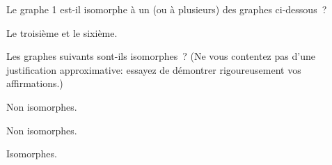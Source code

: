 \begin{exo}
Le graphe 1 est-il isomorphe \`a un (ou \`a plusieurs) des graphes ci-dessous~?
\end{exo}

\begin{figure}[!h]
\centering
\scalebox{.825}{}
\caption{}
\end{figure}

\begin{figure}[!h]
\scalebox{.825}{}
\caption{}
\end{figure}

Le troisième et le sixième.

\newpage


\begin{exo}
Les graphes suivants sont-ils isomorphes~? (Ne vous contentez pas d'une justification approximative: essayez de d\'emontrer rigoureusement vos affirmations.)
\end{exo}

\begin{figure}[!h]
\centering

\caption{}
\end{figure}%

Non isomorphes. \\

\begin{figure}[!h]
\centering

\caption{}
\end{figure}

Non isomorphes.\\

\begin{figure}[!h]
\centering

\caption{}
\end{figure}

Isomorphes.\\